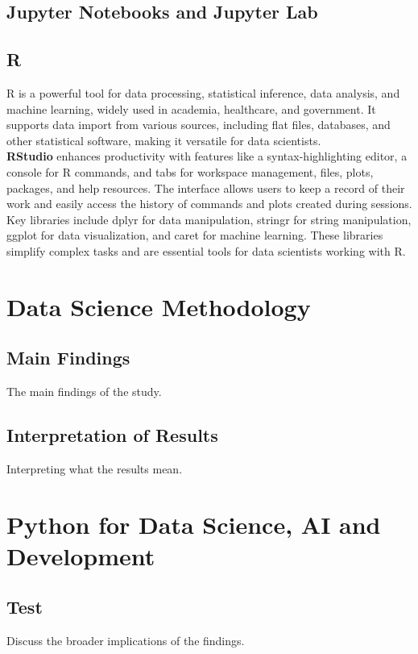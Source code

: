 \documentclass[12pt]{report} %
\begin{document}
	\section{Jupyter Notebooks and Jupyter Lab}
	
	\section{R}
	
	R is a powerful tool for data processing, statistical inference, data analysis, and machine learning, widely used in academia, healthcare, and government. It supports data import from various sources, including flat files, databases, and other statistical software, making it versatile for data scientists.\\
	
	\textbf{RStudio} enhances productivity with features like a syntax-highlighting editor, a console for R commands, and tabs for workspace management, files, plots, packages, and help resources. The interface allows users to keep a record of their work and easily access the history of commands and plots created during sessions.\\

	Key libraries include dplyr for data manipulation, stringr for string manipulation, ggplot for data visualization, and caret for machine learning. These libraries simplify complex tasks and are essential tools for data scientists working with R.
	

	
	\chapter{Data Science Methodology}
	\section{Main Findings}
	The main findings of the study.
	
	\section{Interpretation of Results}
	Interpreting what the results mean.
	
	\chapter{Python for Data Science, AI and Development}
	\section{Test}
	Discuss the broader implications of the findings.
	
\end{document}
